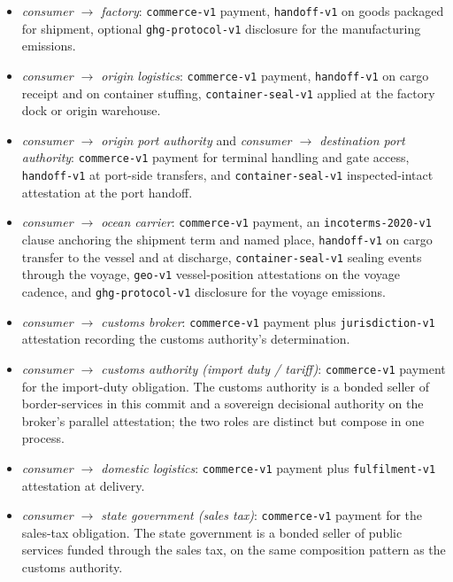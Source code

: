 \documentclass[11pt,a4paper]{article}
\theoremstyle{definition}
\theoremstyle{remark}
\begin{document}
\begin{itemize}
  \item \emph{consumer $\to$ factory}: \texttt{commerce-v1}
    payment, \texttt{handoff-v1} on goods packaged for shipment,
    optional \texttt{ghg-protocol-v1} disclosure for the
    manufacturing emissions.
  \item \emph{consumer $\to$ origin logistics}: \texttt{commerce-v1}
    payment, \texttt{handoff-v1} on cargo receipt and on
    container stuffing, \texttt{container-seal-v1} applied at the
    factory dock or origin warehouse.
  \item \emph{consumer $\to$ origin port authority} and
    \emph{consumer $\to$ destination port authority}:
    \texttt{commerce-v1} payment for terminal handling and gate
    access, \texttt{handoff-v1} at port-side transfers, and
    \texttt{container-seal-v1} inspected-intact attestation at
    the port handoff.
  \item \emph{consumer $\to$ ocean carrier}: \texttt{commerce-v1}
    payment, an \texttt{incoterms-2020-v1} clause anchoring the
    shipment term and named place, \texttt{handoff-v1} on cargo
    transfer to the vessel and at discharge,
    \texttt{container-seal-v1} sealing events through the voyage,
    \texttt{geo-v1} vessel-position attestations on the voyage
    cadence, and \texttt{ghg-protocol-v1} disclosure for the
    voyage emissions.
  \item \emph{consumer $\to$ customs broker}: \texttt{commerce-v1}
    payment plus \texttt{jurisdiction-v1} attestation recording
    the customs authority's determination.
  \item \emph{consumer $\to$ customs authority (import duty /
    tariff)}: \texttt{commerce-v1} payment for the import-duty
    obligation. The customs authority is a bonded seller of
    border-services in this commit and a sovereign decisional
    authority on the broker's parallel attestation; the two
    roles are distinct but compose in one process.
  \item \emph{consumer $\to$ domestic logistics}:
    \texttt{commerce-v1} payment plus \texttt{fulfilment-v1}
    attestation at delivery.
  \item \emph{consumer $\to$ state government (sales tax)}:
    \texttt{commerce-v1} payment for the sales-tax obligation.
    The state government is a bonded seller of public services
    funded through the sales tax, on the same composition pattern
    as the customs authority.
\end{itemize}
\end{document}
